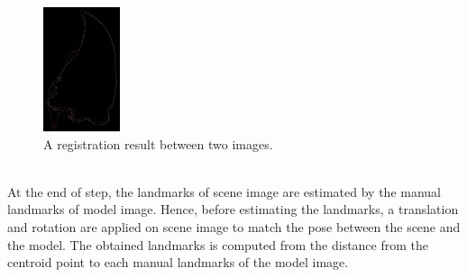 \documentclass[twoside,twocolumn,10pt]{article}
\begin{document}
\begin{figure}[htb]
    \centering
    \includegraphics[width=0.2\textwidth]{./images/imreg}
    \caption{A registration result between two images.}
    \label{fig:box}
\end{figure}~\\
At the end of step, the landmarks of scene image are estimated by the manual landmarks of model image. Hence, before estimating the landmarks, a translation and rotation are applied on scene image to match the pose between the scene and the model. The obtained landmarks is computed from the distance from the centroid point to each manual landmarks of the model image.
\end{document}
